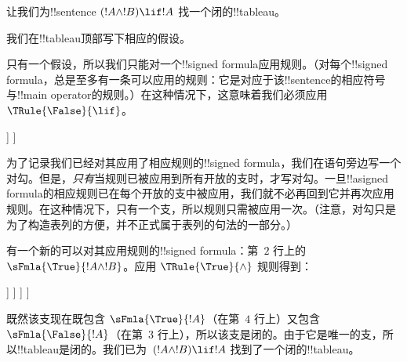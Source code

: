\documentclass[../../../include/open-logic-section]{subfiles}
\begin{document}
      {}
      {}


\begin{ex}
让我们为!!{sentence} $(!A \land !B) \lif !A$ 找一个闭的!!{tableau}。

我们在!!{tableau}顶部写下相应的假设。
\begin{oltableau}
  [\sFmla{\False}{(\formula{A} \land \formula{B}) \lif \formula{A}},
    just = \TAss]
\end{oltableau}

只有一个假设，所以我们只能对一个!!{signed formula}应用规则。（对每个!!{signed formula}，总是至多有一条可以应用的规则：它是对应于该!!{sentence}的相应符号与!!{main operator}的规则。）在这种情况下，这意味着我们必须应用 $\TRule{\False}{\lif}$。
\begin{oltableau}
  [\sFmla{\False}{(\formula{A} \land \formula{B}) \lif \formula{A}},
    checked, just = \TAss
    [\sFmla{\True}{\formula{A} \land \formula{B}},
      just={\TRule{\False}{\lif}[1]}
      [\sFmla{\False}{\formula{A}}, just={\TRule{\False}{\lif}[1]}]
    ]
  ]
\end{oltableau}
为了记录我们已经对其应用了相应规则的!!{signed formula}，我们在语句旁边写一个对勾。但是，\emph{只有}当规则已被应用到所有开放的支时，才写对勾。一旦!!a{signed formula}的相应规则已在每个开放的支中被应用，我们就不必再回到它并再次应用规则。在这种情况下，只有一个支，所以规则只需被应用一次。（注意，对勾只是为了构造表列的方便，并不正式属于表列的句法的一部分。）

有一个新的可以对其应用规则的!!{signed formula}：第~$2$ 行上的 $\sFmla{\True}{!A \land !B}$。应用 $\TRule{\True}{\land}$ 规则得到：
\begin{oltableau}
  [\sFmla{\False}{(\formula{A} \land \formula{B}) \lif \formula{A}},
    checked, just = \TAss
    [\sFmla{\True}{\formula{A} \land \formula{B}},
      just={\TRule{\False}{\lif}[1]}, checked
      [\sFmla{\False}{\formula{A}}, just={\TRule{\False}{\lif}[1]}
        [\sFmla{\True}{\formula{A}}, just={\TRule{\True}{\land}[2]}
          [\sFmla{\True}{\formula{B}}, just={\TRule{\True}{\land}[2]}, close
          ]
        ]
      ]
    ]
  ]
\end{oltableau}
既然该支现在既包含 $\sFmla{\True}{!A}$（在第~$4$ 行上）又包含 $\sFmla{\False}{!A}$（在第~$3$ 行上），所以该支是闭的。由于它是唯一的支，所以!!{tableau}是闭的。我们已为~$(!A \land !B) \lif !A$ 找到了一个闭的!!{tableau}。
\end{ex}
\end{document}
